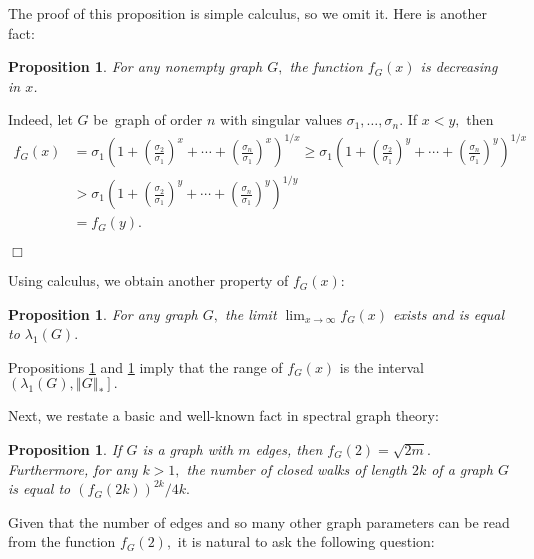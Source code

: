 \documentclass[12pt]{article}%
\newtheorem{proposition}[theorem]{Proposition}
\newenvironment{proof}[1][Proof]{\noindent{\textbf {#1}  }}  {\hfill$\Box$\bigskip}
\begin{document}
The proof of this proposition is simple calculus, so we omit it. Here is
another fact:

\begin{proposition}
\label{ps2}For any nonempty graph $G,$ the function $f_{G}\left(  x\right)  $
is decreasing in $x$.
\end{proposition}

\begin{proof}
Indeed, let $G$ be\ graph of order $n$ with singular values $\sigma_{1}%
,\ldots,\sigma_{n}.$ If $x<y,$ then%
\begin{align*}
f_{G}\left(  x\right)   &  =\sigma_{1}\left(  1+\left(  \frac{\sigma_{2}%
}{\sigma_{1}}\right)  ^{x}+\cdots+\left(  \frac{\sigma_{n}}{\sigma_{1}%
}\right)  ^{x}\right)  ^{1/x}\geq\sigma_{1}\left(  1+\left(  \frac{\sigma_{2}%
}{\sigma_{1}}\right)  ^{y}+\cdots+\left(  \frac{\sigma_{n}}{\sigma_{1}%
}\right)  ^{y}\right)  ^{1/x}\\
&  >\sigma_{1}\left(  1+\left(  \frac{\sigma_{2}}{\sigma_{1}}\right)
^{y}+\cdots+\left(  \frac{\sigma_{n}}{\sigma_{1}}\right)  ^{y}\right)
^{1/y}\\
&  =f_{G}\left(  y\right)  .
\end{align*}

\end{proof}

Using calculus, we obtain another property of $f_{G}\left(  x\right)  :$

\begin{proposition}
\label{ps3}For any graph $G,$ the limit $\lim_{x\rightarrow\infty}f_{G}\left(
x\right)  $ exists and is equal to $\lambda_{1}\left(  G\right)  .$
\end{proposition}

Propositions \ref{ps2} and \ref{ps3} imply that the range of $f_{G}\left(
x\right)  $ is the interval $\left(  \lambda_{1}\left(  G\right)  ,\left\Vert
G\right\Vert _{\ast}\right]  .$ \medskip

Next, we restate a basic and well-known fact in spectral graph theory:

\begin{proposition}
\label{ps4}If $G$ is a graph with $m$ edges, then $f_{G}\left(  2\right)
=\sqrt{2m}.$ Furthermore, for any $k>1,$ the number of closed walks of length
$2k$ of a graph $G$ is equal to $\left(  f_{G}\left(  2k\right)  \right)
^{2k}/4k.$
\end{proposition}

Given that the number of edges and so many other graph parameters can be read
from the function $f_{G}\left(  2\right)  ,$ it is natural to ask the
following question:
\end{document}
